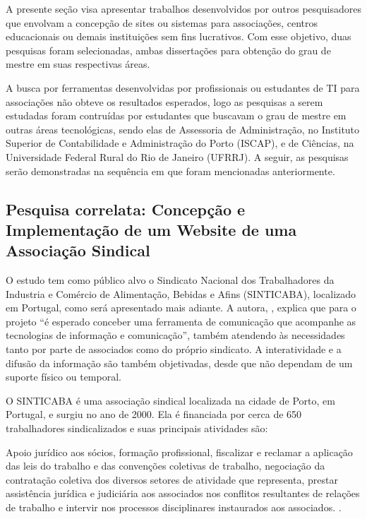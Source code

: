 A presente seção visa apresentar trabalhos desenvolvidos por outros pesquisadores que envolvam a concepção de sites ou sistemas para associações, centros educacionais ou demais instituições sem fins lucrativos. Com esse objetivo, duas pesquisas foram selecionadas, ambas dissertações para obtenção do grau de mestre em suas respectivas áreas. 

A busca por ferramentas desenvolvidas por profissionais ou estudantes de TI para associações não obteve os resultados esperados, logo as pesquisas a serem estudadas foram contruídas por estudantes que buscavam o grau de mestre em outras áreas tecnológicas, sendo elas de Assessoria de Administração, no Instituto Superior de Contabilidade e Administração do Porto (ISCAP), e de Ciências, na Universidade Federal Rural do Rio de Janeiro (UFRRJ). A seguir, as pesquisas serão demonstradas na sequência em que foram mencionadas anteriormente. 

\hspace{2.5cm}
\subsection{Pesquisa correlata: Concepção e Implementação de um Website de uma Associação Sindical}
\hspace{2.5cm}

O estudo tem como público alvo o Sindicato Nacional dos Trabalhadores da Industria e Comércio de Alimentação, Bebidas e Afins (SINTICABA), localizado em Portugal, como será apresentado mais adiante. A autora, , explica que para o projeto ``é esperado conceber uma ferramenta de comunicação que acompanhe as tecnologias de informação e comunicação'', também atendendo às necessidades tanto por parte de associados como do próprio sindicato. A interatividade e a difusão da informação são também objetivadas, desde que não dependam de um suporte físico ou temporal.

O SINTICABA é uma associação sindical localizada na cidade de Porto, em Portugal, e surgiu no ano de 2000. Ela é financiada por cerca de 650 trabalhadores sindicalizados e suas principais atividades são: 

\begin{citacao}
Apoio jurídico aos sócios, formação profissional, fiscalizar e reclamar a aplicação das leis do trabalho e das convenções coletivas de trabalho, negociação da contratação coletiva dos diversos setores de atividade que representa, prestar assistência jurídica e judiciária aos associados nos conflitos resultantes de relações de trabalho e intervir nos processos disciplinares instaurados aos associados. .
\end{citacao}

